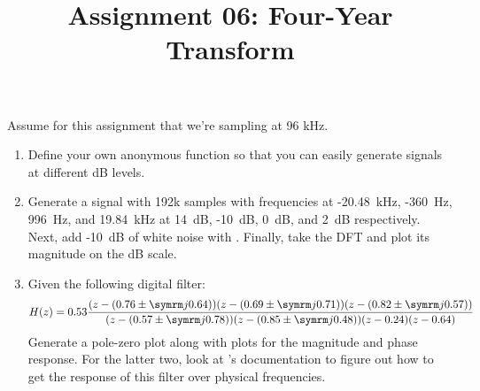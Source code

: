 \documentclass{article}
\title{Assignment 06: Four-Year Transform}
\begin{document}
\renderTitle

Assume for this assignment that we're sampling at 96 kHz.

\begin{enumerate}[leftmargin=*]
	\item
		Define your own anonymous  function
		so that you can easily generate signals at different dB
		levels.

	\item
		Generate a signal with 192k samples with frequencies at
		-20.48~kHz, -360~Hz, 996~Hz, and 19.84~kHz at 14~dB,
		-10~dB, 0~dB, and 2~dB respectively.  Next, add -10~dB
		of white noise with .  Finally, take
		the DFT and plot its magnitude on the dB scale.

	\item
		Given the following digital filter:
		\begin{equation}
			H(z)
			=
			0.53
			\frac
			{
				(z - (0.76 \pm \im 0.64))
				(z - (0.69 \pm \im 0.71))
				(z - (0.82 \pm \im 0.57))
			}
			{
				(z - (0.57 \pm \im 0.78))
				(z - (0.85 \pm \im 0.48))
				(z - 0.24)
				(z - 0.64)
			}
		\end{equation}
		Generate a pole-zero plot along with plots for the
		magnitude and phase response.  For the latter two, look
		at 's documentation to figure out how
		to get the response of this filter over physical
		frequencies.
\end{enumerate}
\end{document}
